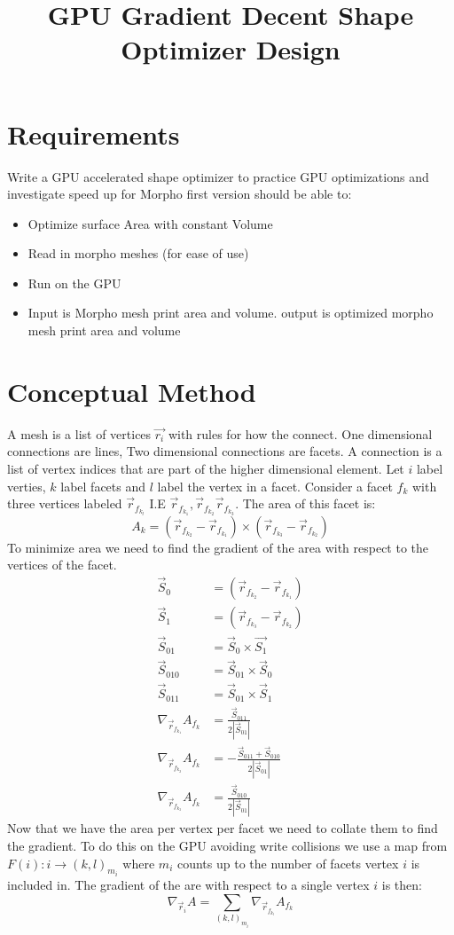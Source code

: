 \documentclass[]{article}
\title{GPU Gradient Decent Shape Optimizer Design}
\author{}
\begin{document}
	
\maketitle
	
	
\section{Requirements}
Write a GPU accelerated shape optimizer to practice GPU optimizations and investigate speed up for Morpho first version should be able to:
\begin{itemize}
	\item Optimize surface Area with constant Volume
	\item Read in morpho meshes (for ease of use)
	\item Run on the GPU
	\item Input is Morpho mesh print area and volume. output is optimized morpho mesh print area and volume
\end{itemize}
	
\section{Conceptual Method}
A mesh is a list of vertices $\vec{r_i}$ with rules for how the connect. One dimensional connections are lines, Two dimensional connections are facets. A connection is a list of vertex indices that are part of the higher dimensional element. Let $i$ label verties, $k$ label facets and $l$ label the vertex in a facet.
Consider a facet $f_k$ with three vertices labeled $\vec{r}_{f_{k_l}}$ I.E $\vec{r}_{f_{k_1}},\vec{r}_{f_{k_2}}\vec{r}_{f_{k_3}}$. The area of this facet is:
$$A_k = (\vec{r}_{f_{k_2}} - \vec{r}_{f_{k_1}}) \times  (\vec{r}_{f_{k_3}} - \vec{r}_{f_{k_2}})$$
To minimize area we need to find the gradient of the area with respect to the vertices of the facet.
\begin{align}
	\vec{S}_0 &=  (\vec{r}_{f_{k_2}} - \vec{r}_{f_{k_1}})\\
	\vec{S}_1 &= (\vec{r}_{f_{k_3}} - \vec{r}_{f_{k_2}})\\
	\vec{S}_{01} &= \vec{S}_0\times \vec{S_1}\\
	\vec{S}_{010} &= \vec{S}_{01}\times \vec{S}_0\\
	\vec{S}_{011} &= \vec{S}_{01}\times \vec{S}_1\\
	\nabla_{\vec{r}_{f_{k_1}}}A_{f_k} &=  \frac{\vec{S}_{011}}{2 |\vec{S}_{01}|}\\
	\nabla_{\vec{r}_{f_{k_2}}}A_{f_k} &=  -\frac{\vec{S}_{011}+\vec{S}_{010}}{2 |\vec{S}_{01}|}\\
	\nabla_{\vec{r}_{f_{k_3}}}A_{f_k} &=  \frac{\vec{S}_{010}}{2 |\vec{S}_{01}|}
\end{align}
Now that we have the area per vertex per facet we need to collate them to find the gradient. To do this on the GPU avoiding write collisions we use a map from $F(i):i\rightarrow{(k,l)_{m_i}}$ where $m_i$ counts up to the number of facets vertex $i$ is included in. The gradient of the are with respect to a single vertex $i$ is then:
$$\nabla_{\vec{r}_i} A = \sum_{(k,l)_{m_i}} \nabla_{\vec{r}_{f_{k_l}}}A_{f_k}$$
\end{document}

